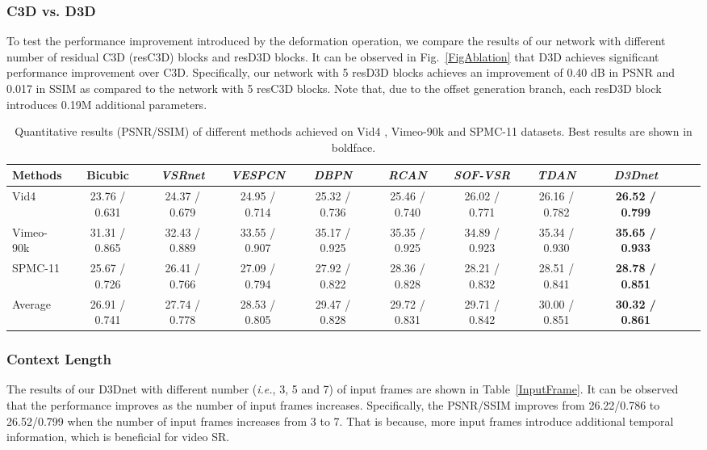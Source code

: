 \documentclass[journal]{IEEEtran}
\begin{document}
\subsubsection{C3D vs. D3D}
To test the performance improvement introduced by the deformation operation, we compare the results of our network with different number of residual C3D (resC3D) blocks and resD3D blocks. It can be observed in Fig.~\ref{FigAblation} that D3D achieves significant performance improvement over C3D. Specifically, our network with 5 resD3D blocks achieves an improvement of 0.40 dB in PSNR and 0.017 in SSIM as compared to the network with 5 resC3D blocks. Note that, due to the offset generation branch, each resD3D block introduces 0.19M additional parameters.

\begin{table*}
\footnotesize
\centering
\renewcommand\arraystretch{1.4}
\caption{Quantitative results (PSNR/SSIM) of different methods achieved on Vid4 \cite{VESPCN}, Vimeo-90k \cite{Vimeo} and SPMC-11 \cite{DRVSR} datasets. Best results are shown in boldface.}\label{quantitative1}
\scriptsize
\begin{tabular}{|l|c|c|c|c|c|c|c|c|c|c|}
\hline
Methods&Bicubic & \textit{VSRnet} \cite{VSRnet}&\textit{VESPCN} \cite{VESPCN}& \textit{DBPN} \cite{DBPN}&\textit{RCAN} \cite{RCAN}&\textit{SOF-VSR} \cite{SOFVSR20}&\textit{TDAN} \cite{TDAN}&\textit{D3Dnet}\\
\hline
Vid4 \cite{VESPCN}& 23.76 / 0.631	&24.37 / 0.679 &24.95 / 0.714&	25.32 / 0.736&	25.46 / 0.740&	26.02 / 0.771&	26.16 / 0.782&	\textbf{26.52 / 0.799}\\

Vimeo-90k \cite{Vimeo}&31.31 / 0.865& 32.43 / 0.889	&	33.55 / 0.907	&35.17 / 0.925	& 35.35 / 0.925	&34.89 / 0.923	&35.34 / 0.930&	\textbf{35.65 / 0.933}\\

SPMC-11 \cite{DRVSR}&25.67 / 0.726& 26.41 / 0.766&	27.09 / 0.794&	27.92 / 0.822	&28.36 / 0.828	&28.21 / 0.832	&28.51 / 0.841	& \textbf{28.78 / 0.851}\\
\hline
Average &26.91 / 0.741&27.74 / 0.778&	28.53 / 0.805	&29.47 / 0.828	&29.72 / 0.831	&29.71 / 0.842	&30.00 / 0.851	&\textbf{30.32 / 0.861}\\
\hline
\end{tabular}
\end{table*}


\subsubsection{Context Length}\label{ablationNums}
 The results of our D3Dnet with different number (\textit{i.e.}, 3, 5 and 7) of input frames are shown in Table~\ref{InputFrame}. It can be observed that the performance improves as the number of input frames increases. Specifically, the PSNR/SSIM improves from 26.22/0.786 to 26.52/0.799 when the number of input frames increases from 3 to 7. That is because, more input frames introduce additional temporal information, which is beneficial for video SR.
\end{document}
